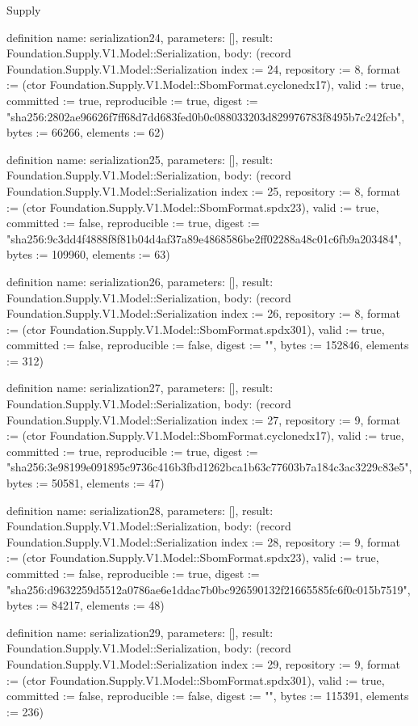 \begin{lexlean}{Supply}
\begin{semanticmodule}
definition{
  name: serialization24,
  parameters: [],
  result: Foundation.Supply.V1.Model::Serialization,
  body: (record Foundation.Supply.V1.Model::Serialization {index := 24, repository := 8, format := (ctor Foundation.Supply.V1.Model::SbomFormat.cyclonedx17), valid := true, committed := true, reproducible := true, digest := "sha256:2802ae96626f7ff68d7dd683fed0b0c088033203d829976783f8495b7c242fcb", bytes := 66266, elements := 62})
}

definition{
  name: serialization25,
  parameters: [],
  result: Foundation.Supply.V1.Model::Serialization,
  body: (record Foundation.Supply.V1.Model::Serialization {index := 25, repository := 8, format := (ctor Foundation.Supply.V1.Model::SbomFormat.spdx23), valid := true, committed := false, reproducible := true, digest := "sha256:9c3dd4f4888f8f81b04d4af37a89e4868586be2ff02288a48c01c6fb9a203484", bytes := 109960, elements := 63})
}

definition{
  name: serialization26,
  parameters: [],
  result: Foundation.Supply.V1.Model::Serialization,
  body: (record Foundation.Supply.V1.Model::Serialization {index := 26, repository := 8, format := (ctor Foundation.Supply.V1.Model::SbomFormat.spdx301), valid := true, committed := false, reproducible := false, digest := "", bytes := 152846, elements := 312})
}

definition{
  name: serialization27,
  parameters: [],
  result: Foundation.Supply.V1.Model::Serialization,
  body: (record Foundation.Supply.V1.Model::Serialization {index := 27, repository := 9, format := (ctor Foundation.Supply.V1.Model::SbomFormat.cyclonedx17), valid := true, committed := true, reproducible := true, digest := "sha256:3e98199e091895c9736c416b3fbd1262bca1b63c77603b7a184c3ac3229c83e5", bytes := 50581, elements := 47})
}

definition{
  name: serialization28,
  parameters: [],
  result: Foundation.Supply.V1.Model::Serialization,
  body: (record Foundation.Supply.V1.Model::Serialization {index := 28, repository := 9, format := (ctor Foundation.Supply.V1.Model::SbomFormat.spdx23), valid := true, committed := false, reproducible := true, digest := "sha256:d9632259d5512a0786ae6e1ddac7b0bc926590132f21665585fc6f0c015b7519", bytes := 84217, elements := 48})
}

definition{
  name: serialization29,
  parameters: [],
  result: Foundation.Supply.V1.Model::Serialization,
  body: (record Foundation.Supply.V1.Model::Serialization {index := 29, repository := 9, format := (ctor Foundation.Supply.V1.Model::SbomFormat.spdx301), valid := true, committed := false, reproducible := false, digest := "", bytes := 115391, elements := 236})
}


\end{semanticmodule}
\end{lexlean}
